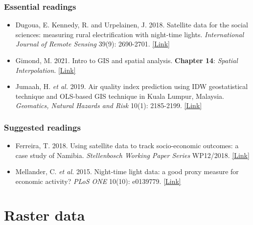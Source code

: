 \documentclass[
]{book}
\providecommand{\tightlist}{%
  \setlength{\itemsep}{0pt}\setlength{\parskip}{0pt}}
\begin{document}
\hypertarget{essential-readings-8}{%
\subsubsection*{Essential readings}\label{essential-readings-8}}

\begin{itemize}
\tightlist
\item
  Dugoua, E. Kennedy, R. and Urpelainen, J. 2018. Satellite data for the social sciences: measuring rural electrification with night-time lights. \emph{International Journal of Remote Sensing} 39(9): 2690-2701. \href{https://doi.org/10.1080/01431161.2017.1420936}{{[}Link{]}}
\item
  Gimond, M. 2021. Intro to GIS and spatial analysis. \textbf{Chapter 14}: \emph{Spatial Interpolation}. \href{https://mgimond.github.io/Spatial/spatial-interpolation.html}{{[}Link{]}}
\item
  Jumaah, H. \emph{et al.} 2019. Air quality index prediction using IDW geostatistical technique and OLS-based GIS technique in Kuala Lumpur, Malaysia. \emph{Geomatics, Natural Hazards and Risk} 10(1): 2185-2199. \href{https://doi.org/10.1080/19475705.2019.1683084}{{[}Link{]}}
\end{itemize}

\hypertarget{suggested-readings-8}{%
\subsubsection*{Suggested readings}\label{suggested-readings-8}}

\begin{itemize}
\tightlist
\item
  Ferreira, T. 2018. Using satellite data to track socio-economic outcomes: a case study of Namibia. \emph{Stellenbosch Working Paper Series} WP12/2018. \href{https://www.ekon.sun.ac.za/wpapers/2018/wp122018}{{[}Link{]}}
\item
  Mellander, C. \emph{et al.} 2015. Night-time light data: a good proxy measure for economic activity? \emph{PLoS ONE} 10(10): e0139779. \href{https://doi.org/10.1371/journal.pone.0139779}{{[}Link{]}}
\end{itemize}

\hypertarget{raster-data}{%
\section{Raster data}\label{raster-data}}
\end{document}
